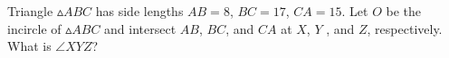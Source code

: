 Triangle $\vartriangle ABC$ has side lengths $AB = 8$, $BC = 17$, $CA = 15$. Let $O$ be the incircle of $\vartriangle ABC$ and intersect $AB$, $BC$, and $CA$ at $X$, $Y$ , and $Z$, respectively. What is $\angle XY Z$?
